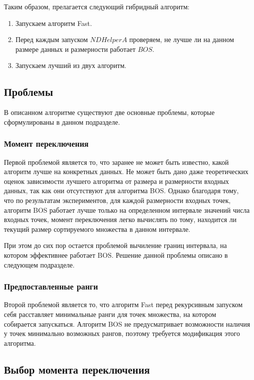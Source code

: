 Таким образом, прелагается следующий гибридный алгоритм:
\begin{enumerate}
 \item Запускаем алгоритм Fast.
 \item Перед каждым запуском $NDHelperA$ проверяем, не лучше ли на данном размере данных и размерности работает $BOS$.
 \item Запускаем лучший из двух алгоритм.
\end{enumerate}

\subsection{Проблемы}

В описанном алгоритме существуют две основные проблемы, которые сформулированы в данном подразделе.

\subsubsection{Момент переключения}

Первой проблемой является то, что заранее не может быть известно, какой алгоритм лучше на конкретных данных. Не
может быть дано даже теоретических оценок зависимости лучшего алгоритма от размера и размерности входных данных,
так как они отсутствуют для алгоритма BOS. Однако благодаря тому, что по результатам экспериментов, для каждой
размерности входных точек, алгоритм BOS работает лучше только на определенном интервале значений числа входных
точек, момент переключения легко вычислять по тому, находится ли текущий размер сортируемого множества в данном
интервале.

При этом до сих пор остается проблемой вычиление границ интервала, на котором эффективнее работает BOS. Решение
данной проблемы описано в следующем подразделе.

\subsubsection{Предпоставленные ранги}

Второй проблемой является то, что алгоритм Fast перед рекурсивным запуском себя расставляет минимальные ранги для
точек множества, на котором собирается запускаться. Алгоритм BOS не предусматривает возможности наличия у точек
минимально возможных рангов, поэтому требуется модификация этого алгоритма.

\subsection{Выбор момента переключения}

